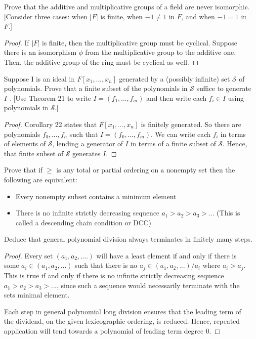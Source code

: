 \documentclass[10pt]{article}
\newenvironment{problem}[2][Problem]{\begin{trivlist}
		\item[\hskip \labelsep {\bfseries #1}\hskip \labelsep {\bfseries #2.}]}{\end{trivlist}}
\begin{document}
	\begin{problem}{5.7}
		Prove that the additive and multiplicative groups of a field are never isomorphic. [Consider
		three cases: when $|F|$ is finite, when $-1 \not= 1$ in $F$, and when $- 1 = 1$ in $F$.]
		\begin{proof}
			If $|F|$ is finite, then the multiplicative group must be cyclical. Suppose there is an isomorphism $\phi$ from the multiplicative group to the additive one. Then, the additive group of the ring must be cyclical as well.
		\end{proof}
	\end{problem}
	
	\begin{problem}{6.1}
		Suppose I is an ideal in $F[x_1,...,x_n]$ generated by a (possibly infinite) set $\mathcal{S}$ of polynomials. Prove that a finite subset of the polynomials in $\mathcal{S}$ suffice to generate $I$ . [Use Theorem 21 to write $I = (f_1,...,f_m)$ and then write each $f_i \in I$ using polynomials in	$\mathcal{S}$.]
		\begin{proof}
			Corollary 22 states that $F[x_1, ... ,x_n]$ is finitely generated. So there are polynomials $f_0, ..., f_n$ such that $I = (f_0,...,f_m)$. We can write each $f_i$ in terms of elements of $\mathcal{S}$, lending a generator of $I$ in terms of a finite subset of $\mathcal{S}$. Hence, that finite subset of $\mathcal{S}$ generates $I$.
		\end{proof}
	\end{problem}
	
	\begin{problem}{6.3}
		Prove that if $\geq$ is any total or partial ordering on a nonempty set then the following are equivalent:
		\begin{itemize}
			\item[\textbf{(i)}] Every nonempty subset contains a minimum element
			\item[\textbf{(ii)}] There is no infinite strictly decreasing sequence $a_1 > a_2 > a_3 > ...$ (This is called a descending chain condition or DCC)
		\end{itemize}
		Deduce that general polynomial division always terminates in finitely many steps.
		\begin{proof}
			Every set $(a_1, a_2, ....)$ will have a least element if and only if there is some $a_i \in (a_1, a_2, ...)$ such that there is no $a_j \in (a_1, a_2, ...)/a_i$ where $a_i > a_j$. This is true if and only if there is no infinite strictly decreasing sequence $a_1 > a_2 > a_3 > ...$, since such a sequence would necessarily terminate with the sets minimal element.
			
			Each step in general polynomial long division ensures that the leading term of the dividend, on the given lexicographic ordering, is reduced. Hence, repeated application will tend towards a polynomial of leading term degree 0.
		\end{proof}
	\end{problem}
	
\end{document}
